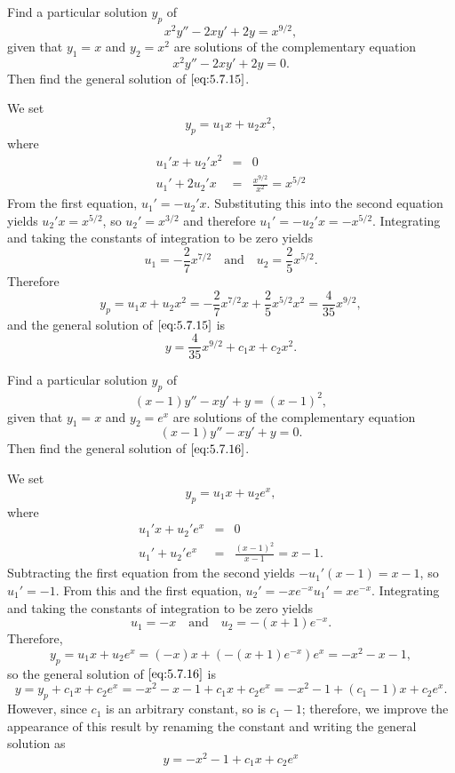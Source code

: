 \documentclass{ximera}
\begin{document}
\begin{example}\label{example:5.7.1}
 Find a particular
solution $y_p$ of
\begin{equation} \label{eq:5.7.15}
x^2y''-2xy'+2y=x^{9/2},
\end{equation}
given that $y_1=x$ and $y_2=x^2$ are solutions of the complementary
equation
$$
x^2y''-2xy'+2y=0.
$$
 Then find the general solution of $\eqref{eq:5.7.15}$.
 
 
\begin{explanation}
We set
$$
y_p=u_1x+u_2x^2,
$$
where
\begin{eqnarray*}
u_1'x+u_2'x^2&=&0\\
u_1'+2u_2'x&=&\frac{x^{9/2}}{x^2}=x^{5/2}
\end{eqnarray*}
From the first equation, $u_1'=-u_2'x$. Substituting this into the
second equation yields $u_2'x=x^{5/2}$, so $u_2'=x^{3/2}$ and
therefore $u_1'=-u_2'x=-x^{5/2}$. Integrating and taking the constants
of integration to be zero yields
$$
u_1=-\frac{2}{7}x^{7/2}\quad\mbox{and}\quad u_2=\frac{2}{5}x^{5/2}.
$$
Therefore
$$
y_p=u_1x+u_2x^2
=-\frac{2}{7}x^{7/2}x+\frac{2}{5}x^{5/2}x^2=\frac{4}{35}x^{9/2},
$$
and the general solution of  $\eqref{eq:5.7.15}$ is
$$
y=\frac{4}{35}x^{9/2}+c_1x+c_2x^2.
$$
\end{explanation}
\end{example}
 
\begin{example}\label{example:5.7.2}
 Find a particular
solution $y_p$ of
\begin{equation} \label{eq:5.7.16}
(x-1)y''-xy'+y=(x-1)^2,
\end{equation}
given that $y_1=x$ and $y_2=e^x$ are solutions of the complementary
equation
$$
(x-1)y''-xy'+y=0.
$$
 Then find the general solution of $\eqref{eq:5.7.16}$.
 
\begin{explanation}
We set
$$
y_p=u_1x+u_2e^x,
$$
where
\begin{eqnarray*}
u_1'x+u_2'e^x&=&0\\
u_1'+u_2'e^x&=&\frac{(x-1)^2}{x-1}=x-1.
\end{eqnarray*}
Subtracting the first equation from the second yields
$-u_1'(x-1)=x-1$, so $u_1'=-1$. From this and the first equation,
$u_2'=-xe^{-x}u_1'=xe^{-x}$.
Integrating and taking the constants of integration to be zero yields
$$
u_1=-x  \quad\mbox{and}\quad u_2=-(x+1)e^{-x}.
$$
Therefore,
$$
y_p=u_1x+u_2e^x
=(-x)x+(-(x+1)e^{-x})e^x=-x^2-x-1,
$$
so the general solution of $\eqref{eq:5.7.16}$ is
\begin{equation} \label{eq:5.7.17}
y=y_p+c_1x+c_2e^x=-x^2-x-1+c_1x+c_2e^x = -x^2-1+(c_1-1)x+c_2e^x.
\end{equation}
However, since $c_1$ is an arbitrary constant, so is $c_1-1$;
therefore, we  improve the appearance of this result by
renaming the constant and writing the general solution as
\begin{equation} \label{eq:5.7.18}
y= -x^2-1+c_1x+c_2e^x
\end{equation}
\end{explanation}
\end{example}
 
\end{document}
